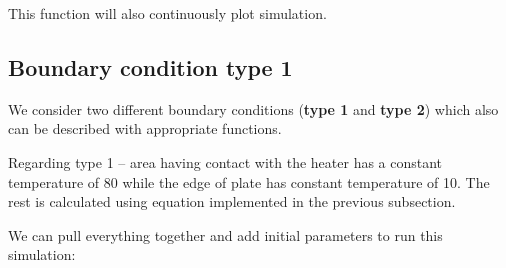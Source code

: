 \documentclass[12pt]{article}
\begin{document}
This function will also continuously plot simulation.

\subsection{Boundary condition type 1}

We consider two different boundary conditions (\textbf{type 1} and \textbf{type 2}) which also can be described with appropriate functions.

Regarding type 1 -- area having contact with the heater has a constant temperature of 80 while the edge of plate has constant temperature of 10. The rest is calculated using equation implemented in the previous subsection.



We can pull everything together and add initial parameters to run this simulation:


\end{document}
